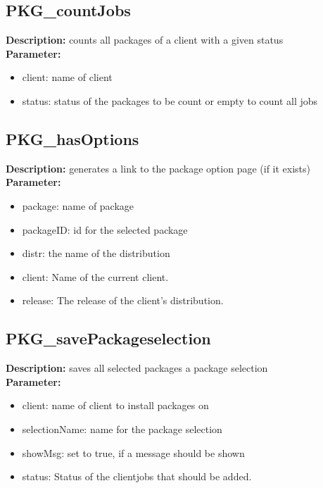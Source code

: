 \subsection{PKG\_countJobs}
\textbf{Description:} counts all packages of a client with a given status\\
\textbf{Parameter:}
\begin{itemize}
\item client: name of client
\item status: status of the packages to be count or empty to count all jobs
\end{itemize}

\subsection{PKG\_hasOptions}
\textbf{Description:} generates a link to the package option page (if it exists)\\
\textbf{Parameter:}
\begin{itemize}
\item package: name of package
\item packageID: id for the selected package
\item distr: the name of the distribution
\item client: Name of the current client.
\item release: The release of the client's distribution.
\end{itemize}

\subsection{PKG\_savePackageselection}
\textbf{Description:} saves all selected packages a package selection\\
\textbf{Parameter:}
\begin{itemize}
\item client: name of client to install packages on
\item selectionName: name for the package selection
\item showMsg: set to true, if a message should be shown
\item status: Status of the clientjobs that should be added.
\end{itemize}

